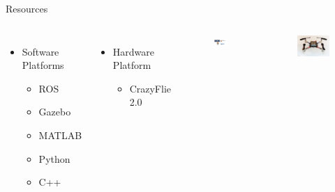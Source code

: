 \documentclass[xcolor=table]{beamer}
\begin{document}
\begin{frame}{Resources}
  \begin{columns}
  \begin{itemize}
  \item Software Platforms
    \begin{itemize}
    \item ROS
    \item Gazebo
    \item MATLAB
    \item Python
    \item C++
    \end{itemize}
  \end{itemize}
  
  \begin{itemize}
  \item Hardware Platform
    \begin{itemize}
    \item CrazyFlie 2.0
    \end{itemize}
  \end{itemize}
  \begin{figure}
  \includegraphics[scale=0.4]{Software_img.png}
  \end{figure}
  \begin{figure}
  \includegraphics[scale=0.4]{Crazy_Flie_img.jpg}
  \end{figure}
  \end{columns}  
\end{frame}
\end{document}
